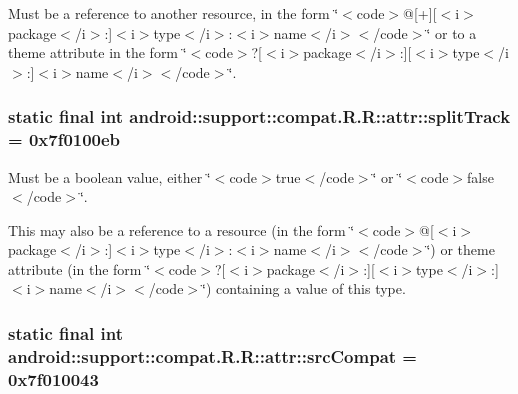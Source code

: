 Must be a reference to another resource, in the form \char`\"{}$<$code$>$@\mbox{[}+\mbox{]}\mbox{[}$<$i$>$package$<$/i$>$:\mbox{]}$<$i$>$type$<$/i$>$:$<$i$>$name$<$/i$>$$<$/code$>$\char`\"{} or to a theme attribute in the form \char`\"{}$<$code$>$?\mbox{[}$<$i$>$package$<$/i$>$:\mbox{]}\mbox{[}$<$i$>$type$<$/i$>$:\mbox{]}$<$i$>$name$<$/i$>$$<$/code$>$\char`\"{}. \hypertarget{classandroid_1_1support_1_1compat_1_1_r_1_1attr_aad9aadcc7dc74d5ec0f48aa2919b396}{
\subsubsection[{splitTrack}]{\setlength{\rightskip}{0pt plus 5cm}static final int android::support::compat.R.R::attr::splitTrack = 0x7f0100eb}}
\label{classandroid_1_1support_1_1compat_1_1_r_1_1attr_aad9aadcc7dc74d5ec0f48aa2919b396}


Must be a boolean value, either \char`\"{}$<$code$>$true$<$/code$>$\char`\"{} or \char`\"{}$<$code$>$false$<$/code$>$\char`\"{}. 

This may also be a reference to a resource (in the form \char`\"{}$<$code$>$@\mbox{[}$<$i$>$package$<$/i$>$:\mbox{]}$<$i$>$type$<$/i$>$:$<$i$>$name$<$/i$>$$<$/code$>$\char`\"{}) or theme attribute (in the form \char`\"{}$<$code$>$?\mbox{[}$<$i$>$package$<$/i$>$:\mbox{]}\mbox{[}$<$i$>$type$<$/i$>$:\mbox{]}$<$i$>$name$<$/i$>$$<$/code$>$\char`\"{}) containing a value of this type. \hypertarget{classandroid_1_1support_1_1compat_1_1_r_1_1attr_8b4e09c9230cdb0785a9a9c03a0d0376}{
\subsubsection[{srcCompat}]{\setlength{\rightskip}{0pt plus 5cm}static final int android::support::compat.R.R::attr::srcCompat = 0x7f010043}}
\label{classandroid_1_1support_1_1compat_1_1_r_1_1attr_8b4e09c9230cdb0785a9a9c03a0d0376}


